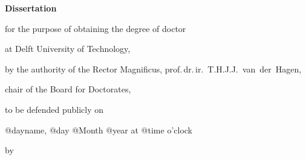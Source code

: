 \begin{titlepage}

\begin{center}

\vspace*{2\bigskipamount}

{\makeatletter
\bfseries\LARGE\sffamily{\@title}
\makeatother}

{\makeatletter
\ifx\@subtitle\undefined\else
    \bigskip
    \Large\@subtitle
\fi
\makeatother}

\end{center}

\pagestyle{empty}
\cleardoublepage

\begin{center}


\vspace*{2\bigskipamount}

{\makeatletter
\bfseries\LARGE\sffamily{\@title}
\makeatother}

{\makeatletter
\ifx\@subtitle\undefined\else
    \bigskip
    \Large\@subtitle
\fi
\makeatother}

\vfill


{\large\bfseries Dissertation}

\bigskip
\bigskip

for the purpose of obtaining the degree of doctor

at Delft University of Technology,

by the authority of the Rector Magnificus, prof.\,dr.\,ir.~T.H.J.J.~van~der~Hagen,

chair of the Board for Doctorates,

to be defended publicly on

@dayname, @day @Month @year at @time o'clock

\bigskip

by

\bigskip

\makeatletter
{\large \@firstname~\@middlename~{\MakeUppercase \@lastname}}
\makeatother


\end{center}
\end{titlepage}

